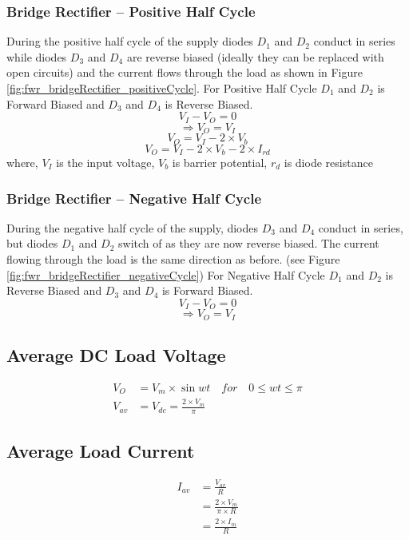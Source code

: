 			\subsubsection{Bridge Rectifier – Positive Half Cycle}
				During the positive half cycle of the supply diodes $D_1$ and $D_2$ conduct in series while diodes $D_3$ and $D_4$ are reverse biased (ideally they can be replaced with open circuits) and the current flows through the load as shown in Figure \ref{fig:fwr_bridgeRectifier_positiveCycle}.				
				For Positive Half Cycle \(D_1\) and \(D_2\) is Forward Biased and \(D_3\) and \(D_4\) is Reverse Biased. $$V_I-V_O=0$$
				$$\Rightarrow V_O=V_I$$
				$$V_O=V_I -2 \times V_b$$
				$$V_O=V_I -2 \times V_b - 2 \times I_{rd}$$
				where,
				\(V_I\) is the input voltage,
				\(V_b\) is barrier potential,
				\(r_d\) is diode resistance
				
			\subsubsection{Bridge Rectifier – Negative Half Cycle}
				During the negative half cycle of the supply, diodes $D_3$ and $D_4$ conduct in series, but diodes $D_1$ and $D_2$ switch of as they are now reverse biased. The current flowing through the load is the same direction as before. (see Figure \ref{fig:fwr_bridgeRectifier_negativeCycle})
				For Negative Half Cycle \(D_1\) and \(D_2\) is Reverse Biased and \(D_3\) and \(D_4\) is Forward Biased. $$V_I-V_O=0$$
				$$\Rightarrow V_O=V_I$$
		
		\subsection{Average DC Load Voltage}
			\begin{align*}
				V_O &= V_m \times \sin wt \quad for \quad 0 \leq wt \leq \pi\\
				V_{av} &= V_{dc}= \frac{2 \times V_m}{\pi}				
			\end{align*}
			
		\subsection{Average Load Current}
			\begin{align*}
				I_{av} &=\frac{V_{av}}{R}\\
				&= \frac{2\times V_m}{\pi \times R}\\
				&= \frac{2 \times I_m}{R}
			\end{align*}			
		
